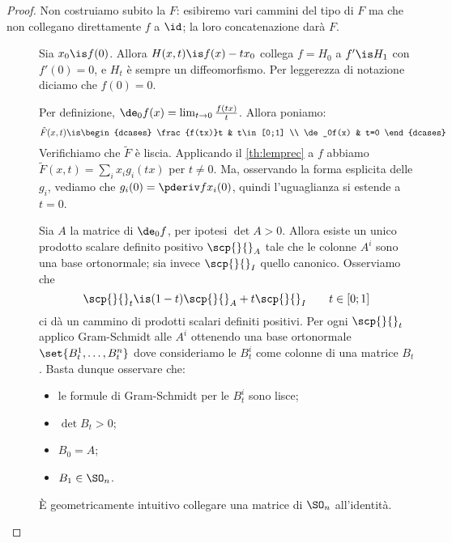 \begin{proof}
	Non costruiamo subito la $F$:
	esibiremo vari cammini del tipo di $F$ ma che non collegano direttamente $f$ a $\id$;
	la loro concatenazione darà $F$.
	
	\newcommand*\ISOMOUSE[2]{\fbox{${#1}\longrightarrow{#2}$}}
	\begin{description}
		\item[\ISOMOUSE{f}{f(0)=0}]
			Sia $x_0\is f(0)$.
			Allora $H(x,t)\is f(x)-tx_0$ collega $f=H_0$ a $f'\is H_1$ con $f'(0)=0$,
			e $H_t$ è sempre un diffeomorfismo.
			Per leggerezza di notazione diciamo che $f(0)=0$.
		\item[\ISOMOUSE{f}{\de_0f}]
			Per definizione, $\de_0f(x)=\lim_{t\to 0}\frac{f(tx)}t$.
			Allora poniamo:
			\[\tilde F(x,t)\is
			\begin{dcases}
				\frac{f(tx)}t & t\in[0;1] \\
				\de_0f(x) & t=0
			\end{dcases}\]
			Verifichiamo che $\tilde F$ è liscia.
			Applicando il \autoref{th:lemprec} a $f$ abbiamo $\tilde F(x,t)=\sum_ix_ig_i(tx)$ per $t\neq 0$.
			Ma, osservando la forma esplicita delle $g_i$,
			vediamo che $g_i(0)=\pderiv f{x_i}(0)$,
			quindi l'uguaglianza si estende a $t=0$.
		\item[\ISOMOUSE{\de_0f}{B_1\in\SO_n}]
			Sia $A$ la matrice di $\de_0f$,
			per ipotesi $\det A>0$.
			Allora esiste un unico prodotto scalare definito positivo $\scp{}{}_A$
			tale che le colonne $A^i$ sono una base ortonormale;
			sia invece $\scp{}{}_I$ quello canonico.
			Osserviamo che
			\[\scp{}{}_t\is (1-t)\scp{}{}_A+t\scp{}{}_I\qquad t\in[0;1]\]
			ci dà un cammino di prodotti scalari definiti positivi.
			Per ogni $\scp{}{}_t$ applico Gram-Schmidt alle $A^i$ ottenendo una base ortonormale
			$\set{B_t^1,\dots,B_t^n}$
			dove consideriamo le $B^i_t$ come colonne di una matrice $B_t$.
			Basta dunque osservare che:
			\begin{itemize}
				\item le formule di Gram-Schmidt per le $B^i_t$ sono lisce;
				\item $\det B_t>0$;
				\item $B_0=A$;
				\item $B_1\in\SO_n$.
			\end{itemize}
		\item[\ISOMOUSE{B_1}{\id}]
			È geometricamente intuitivo collegare una matrice di $\SO_n$ all'identità.
	\end{description}
	

\end{proof}
